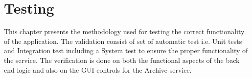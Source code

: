 \chapter{Testing}
This chapter presents the methodology used for testing the correct functionality of the application. The validation consist of set of automatic test i.e.
Unit tests and Integration test including a System test to ensure the proper functionality of the service. The verification is done on both the functional
aspects of the back end logic and also on the GUI controls for the Archive service.


